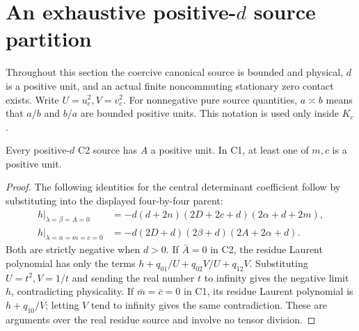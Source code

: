 \section{An exhaustive positive-$d$ source partition}
\label{sec:positive-d-source-partition}

Throughout this section the coercive canonical source is bounded and physical,
$d$ is a positive unit, and an actual finite noncommuting stationary
zero contact exists. Write $U=u_c^2,V=v_c^2$. For nonnegative pure
source quantities, $a\asymp b$ means that $a/b$ and $b/a$ are bounded
positive units. This notation is used only inside $K_c$.

\begin{lemma}
\label{lem:positive-d-forbidden-faces}
Every positive-$d$ C2 source has $A$ a positive unit. In C1, at least
one of $m,c$ is a positive unit.
\end{lemma}
\begin{proof}
The following identities for the central determinant coefficient
follow by substituting into the displayed four-by-four parent:
\begin{align*}
 h\big|_{\lambda=\beta=A=0}
 &=-d(d+2n)(2D+2c+d)(2\alpha+d+2m),\\
 h\big|_{\lambda=n=m=c=0}
 &=-d(2D+d)(2\beta+d)(2A+2\alpha+d).
\end{align*}
Both are strictly negative when $d>0$. If $\bar A=0$ in C2,
the residue Laurent polynomial has only the terms
$h+q_{01}/U+q_{02}V/U+q_{12}V$. Substituting $U=t^2,V=1/t$
and sending the real number $t$ to infinity gives the negative limit
$h$, contradicting physicality. If $\bar m=\bar c=0$ in C1,
its residue Laurent polynomial is $h+q_{10}/V$; letting $V$ tend to
infinity gives the same contradiction. These are arguments over the
real residue source and involve no tensor division.
\end{proof}

